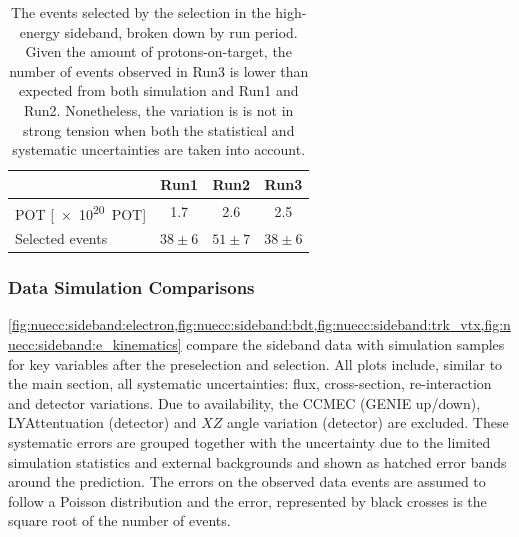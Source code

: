 \begin{table}[htb]
    \centering
\begin{tabular}{@{}lccc@{}}
\toprule
                & Run1 & Run2 & Run3 \\ \midrule
POT [\SI{e20}{POT}]             & 1.7  & 2.6  & 2.5  \\
Selected events & $38\pm6$   & $51\pm7$   & $38\pm6$   \\ \bottomrule
\end{tabular}
    \caption{The events selected by the \nuecc selection in the high-energy sideband, broken down by run period. Given the amount of protons-on-target, the number of events observed in Run3 is lower than expected from both simulation and Run1 and Run2. Nonetheless, the variation is is not in strong tension when both the statistical and systematic uncertainties are taken into account.}
    \label{tab:nuecc:sideband_run_sel_events}
\end{table}


\subsubsection{Data Simulation Comparisons}

 \cref{fig:nuecc:sideband:electron,fig:nuecc:sideband:bdt,fig:nuecc:sideband:trk_vtx,fig:nuecc:sideband:e_kinematics} compare the sideband data with simulation samples for key variables after the preselection and selection. All plots include, similar to the main section, all systematic uncertainties: flux, cross-section, re-interaction and detector variations. Due to availability, the CCMEC (GENIE up/down), LYAttentuation (detector) and $XZ$ angle variation (detector) are excluded. These systematic errors are grouped together with the uncertainty due to the limited simulation statistics and external backgrounds and shown as hatched error bands around the prediction. The errors on the observed data events are assumed to follow a Poisson distribution and the error, represented by black crosses is the square root of the number of events. 

